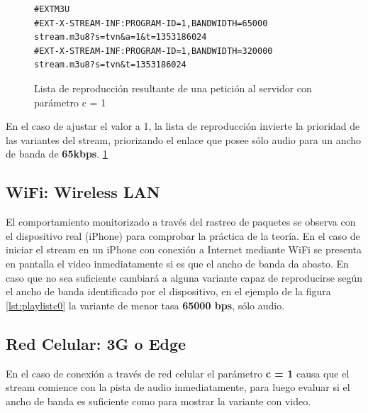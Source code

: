 \begin{figure}[H]
	\centering
\begin{lstlisting}
#EXTM3U
#EXT-X-STREAM-INF:PROGRAM-ID=1,BANDWIDTH=65000
stream.m3u8?s=tvn&a=1&t=1353186024
#EXT-X-STREAM-INF:PROGRAM-ID=1,BANDWIDTH=320000
stream.m3u8?s=tvn&t=1353186024
\end{lstlisting}
\caption{Lista de reproducción resultante de una petición al servidor con parámetro c = 1}
\label{lst:playlistc1}
\end{figure}

En el caso de ajustar el valor a 1, la lista de reproducción invierte la prioridad de las variantes del stream, priorizando el enlace que posee sólo audio para un ancho de banda de \textbf{65kbps}. \ref{lst:playlistc1}


  \subsection{WiFi: Wireless LAN}
  El comportamiento monitorizado a través del rastreo de paquetes se observa con el dispositivo real (iPhone) para comprobar la práctica de la teoría.
  En el caso de iniciar el stream en un iPhone con conexión a Internet mediante WiFi se presenta en pantalla el video inmediatamente si es que el ancho de banda da abasto. En caso que no sea suficiente cambiará a alguna variante capaz de reproducirse según el ancho de banda identificado por el dispositivo, en el ejemplo de la figura \ref{lst:playlistc0} la variante de menor tasa \textbf{65000 bps}, sólo audio.
  
  
  

  \subsection{Red Celular: 3G o Edge}
En el caso de conexión a través de red celular el parámetro \textbf{c = 1} causa que el stream comience con la pista de audio inmediatamente, para luego evaluar si el ancho de banda es suficiente como para mostrar la variante con video.

